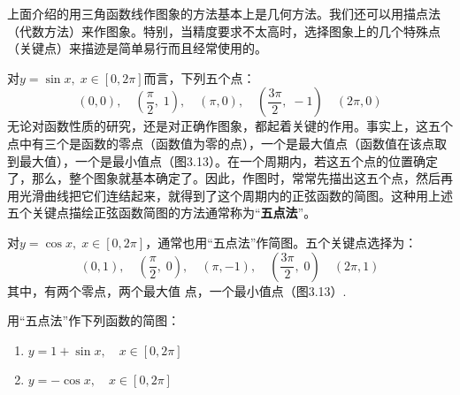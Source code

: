 上面介绍的用三角函数线作图象的方法基本上是几何方法。我们还可以用描点法（代数方法）来作图象。特别，当精度要求不太高时，选择图象上的几个特殊点（关键点）来描迹是简单易行而且经常使用的。
    
对$y=\sin x,\; x\in[0,2\pi]$而言，下列五个点：
\[(0,0),\quad \left(\frac{\pi}{2},\; 1\right),\quad (\pi,0),\quad \left(\frac{3\pi}{2},\; -1\right) \quad (2\pi,0)\]
无论对函数性质的研究，还是对正确作图象，都起着关键的作用。事实上，这五个点中有三个是函数的零点（函数值为零的点），一个是最大值点（函数值在该点取到最大值），一个是最小值点（图3.13）。在一个周期内，若这五个点的位置确定了，那么，整个图象就基本确定了。因此，作图时，常常先描出这五个点，然后再用光滑曲线把它们连结起来，就得到了这个周期内的正弦函数的简图。这种用上述五个关键点描绘正弦函数简图的方法通常称为“\textbf{五点法}”。

对$y=\cos x,\; x\in[0,2\pi]$，通常也用“五点法”作简图。五个关键点选择为：
\[(0,1),\quad \left(\frac{\pi}{2},\; 0\right),\quad (\pi,-1),\quad \left(\frac{3\pi}{2},\; 0\right) \quad (2\pi,1)\]
其中，有两个零点，两个最大值 点，一个最小值点（图3.13）.

\begin{example}
用“五点法”作下列函数的简图：
\begin{enumerate}[(1)]
    \item $y=1+\sin x,\quad x\in[0,2\pi]$
    \item $y=-\cos x,\quad x\in[0,2\pi]$
\end{enumerate}
\end{example}

